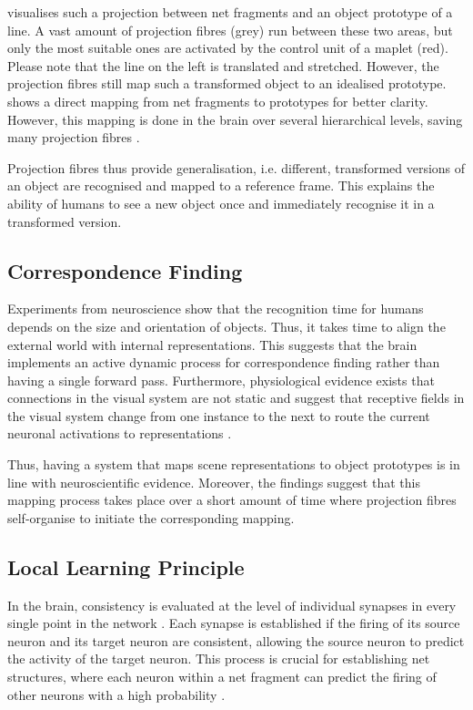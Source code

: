  visualises such a projection between net fragments and an object prototype of a line. A vast amount of projection fibres (grey) run between these two areas, but only the most suitable ones are activated by the control unit of a maplet (red).
Please note that the line on the left is translated and stretched. However, the projection fibres still map such a transformed object to an idealised prototype.
 shows a direct mapping from net fragments to prototypes for better clarity. However, this mapping is done in the brain over several hierarchical levels, saving many projection fibres .

Projection fibres thus provide generalisation, i.e. different, transformed versions of an object are recognised and mapped to a reference frame. This explains the ability of humans to see a new object once and immediately recognise it in a transformed version.

\subsection{Correspondence Finding}
Experiments from neuroscience show that the recognition time for humans depends on the size  and orientation  of objects. Thus, it takes time to align the external world with internal representations.
This suggests that the brain implements an active dynamic process for correspondence finding rather than having a single forward pass.
Furthermore, physiological evidence exists that connections in the visual system are not static and suggest that receptive fields in the visual system change from one instance to the next to route the current neuronal activations to representations .

Thus, having a system that maps scene representations to object prototypes is in line with neuroscientific evidence. Moreover, the findings suggest that this mapping process takes place over a short amount of time where projection fibres self-organise to initiate the corresponding mapping.


\subsection{Local Learning Principle}
In the brain, consistency is evaluated at the level of individual synapses in every single point in the network . Each synapse is established if the firing of its source neuron and its target neuron are consistent, allowing the source neuron to predict the activity of the target neuron. This process is crucial for establishing net structures, where each neuron within a net fragment can predict the firing of other neurons with a high probability .

